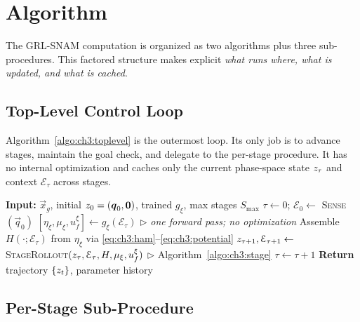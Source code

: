 \section{Algorithm}
\label{sec:ch3:algorithm}

The GRL-SNAM computation is organized as two algorithms plus three
sub-procedures.
This factored structure makes explicit \emph{what runs where, what is updated, and what is cached}. 

\subsection{Top-Level Control Loop}
\label{subsec:ch3:toplevel}

Algorithm~\ref{algo:ch3:toplevel} is the outermost loop.
Its only job is to advance stages, maintain the goal check, and
delegate to the per-stage procedure.
It has no internal optimization and caches only the current
phase-space state $z_\tau$ and context $\mathcal{E}_\tau$
across stages.

\begin{algorithm}[t]
\caption{GRL-SNAM: Top-Level Navigation Loop}
\label{algo:ch3:toplevel}
\begin{algorithmic}[1]
\State \textbf{Input:} $\vec{x}_g$, initial $z_0 = (\boldsymbol{q}_0,\mathbf{0})$,
       trained $g_\xi$, max stages $S_{\max}$
\State $\tau \leftarrow 0$;\; $\mathcal{E}_0 \leftarrow$ \textsc{Sense}$(\vec{q}_0)$
  \State $[\eta_\xi, \mu_\xi, u_f^\xi] \leftarrow g_\xi(\mathcal{E}_\tau)$
         \hfill $\triangleright$ \emph{one forward pass; no optimization}
  \State Assemble $H(\cdot;\mathcal{E}_\tau)$ from $\eta_\xi$
         via \eqref{eq:ch3:ham}--\eqref{eq:ch3:potential}
  \State $z_{\tau+1}, \mathcal{E}_{\tau+1}
         \leftarrow$ \textsc{StageRollout}$(z_\tau, \mathcal{E}_\tau,
         H, \mu_\xi, u_f^\xi)$
         \hfill $\triangleright$ Algorithm~\ref{algo:ch3:stage}
  \State $\tau \leftarrow \tau + 1$
\EndWhile
\State \textbf{Return} trajectory $\{z_t\}$, parameter history
\end{algorithmic}
\end{algorithm}

\subsection{Per-Stage Sub-Procedure}
\label{subsec:ch3:stage}


